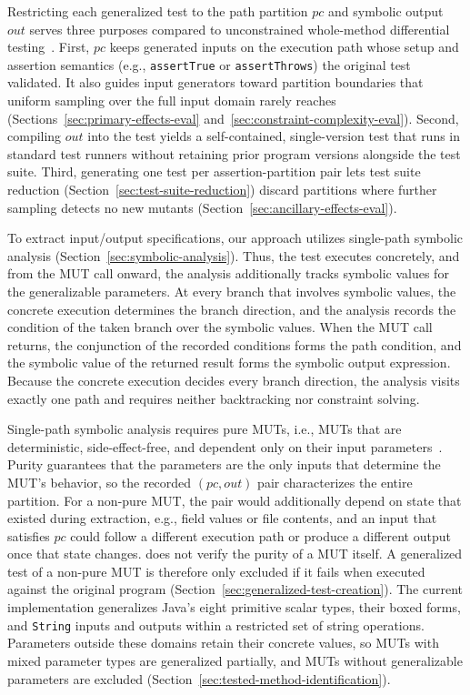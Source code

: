 Restricting each generalized test to the path partition $\mathit{pc}$ and symbolic output $\mathit{out}$ serves three purposes compared to unconstrained whole-method differential testing~\cite{taneja_2008_diffgen,jin_2010_behavioral}.
First, $\mathit{pc}$ keeps generated inputs on the execution path whose setup and assertion semantics (e.g., \texttt{assertTrue} or \texttt{assertThrows}) the original test validated.
It also guides input generators toward partition boundaries that uniform sampling over the full input domain rarely reaches (Sections~\ref{sec:primary-effects-eval} and~\ref{sec:constraint-complexity-eval}).
Second, compiling $\mathit{out}$ into the test yields a self-contained, single-version test that runs in standard test runners without retaining prior program versions alongside the test suite.
Third, generating one test per assertion-partition pair lets test suite reduction (Section~\ref{sec:test-suite-reduction}) discard partitions where further sampling detects no new mutants (Section~\ref{sec:ancillary-effects-eval}).

To extract input/output specifications,
our approach utilizes single-path symbolic analysis (Section~\ref{sec:symbolic-analysis}).
Thus, the test executes concretely, and from the MUT call onward,
the analysis additionally tracks symbolic values for the generalizable parameters.
At every branch that involves symbolic values,
the concrete execution determines the branch direction,
and the analysis records the condition of the taken branch over the symbolic values.
When the MUT call returns, the conjunction of the recorded conditions forms the path condition,
and the symbolic value of the returned result forms the symbolic output expression.
Because the concrete execution decides every branch direction,
the analysis visits exactly one path and requires neither backtracking nor constraint solving.

Single-path symbolic analysis requires pure MUTs,
i.e., MUTs that are deterministic, side-effect-free,
and dependent only on their input parameters~\cite{cadar_2013_symbolic,baldoni_2018_survey}.
Purity guarantees that the parameters are the only inputs that determine the MUT's behavior,
so the recorded $(\mathit{pc}, \mathit{out})$ pair characterizes the entire partition.
For a non-pure MUT, the pair would additionally depend on state
that existed during extraction, e.g., field values or file contents,
and an input that satisfies $\mathit{pc}$ could follow a different execution path
or produce a different output once that state changes.
\ToolTeralizer{} does not verify the purity of a MUT itself.
A generalized test of a non-pure MUT is therefore only excluded
if it fails when executed against the original program
(Section~\ref{sec:generalized-test-creation}).
The current implementation generalizes Java's eight primitive scalar types,
their boxed forms, and \texttt{String} inputs and outputs within a restricted
set of string operations.
Parameters outside these domains retain their concrete values,
so MUTs with mixed parameter types are generalized partially,
and MUTs without generalizable parameters are excluded
(Section~\ref{sec:tested-method-identification}).

